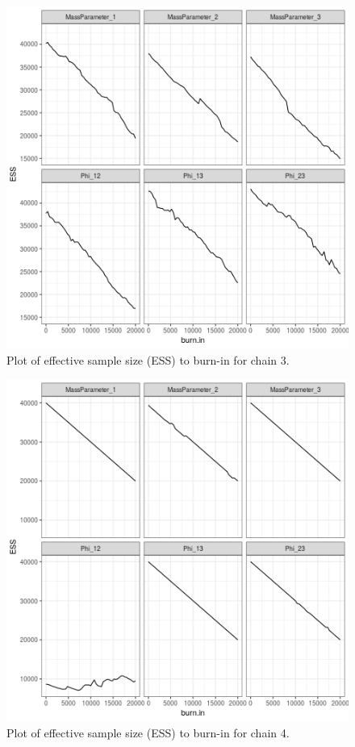 \documentclass[12pt]{article} %
\begin{document}
\newpage

\begin{figure}[h]
	\centering
	\includegraphics[scale=0.65]{Images/Gen_data/Case_2/Esimated_burn_in_plot_3.png}
	\caption{Plot of effective sample size (ESS) to burn-in for chain 3.}
	\label{fig:case_2_esimated_burn_in_plot_3}
\end{figure}

\newpage

\begin{figure}[h]
	\centering
	\includegraphics[scale=0.65]{Images/Gen_data/Case_2/Esimated_burn_in_plot_4.png}
	\caption{Plot of effective sample size (ESS) to burn-in for chain 4.}
	\label{fig:case_2_esimated_burn_in_plot_4}
\end{figure}
\end{document}
